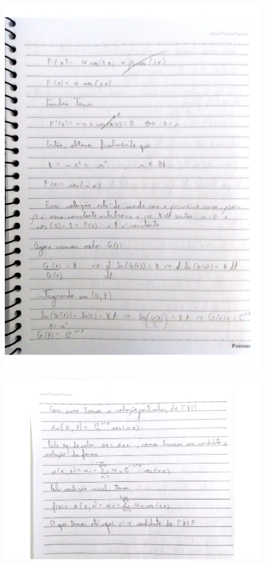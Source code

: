 \documentclass[a4paper]{article}
\begin{document}
                \begin{figure}{\textwidth}
            \centering
            \includegraphics[width=\textwidth]{Questoes-1-3_page-0005.jpg}
        \end{figure}
                        \begin{figure}{\textwidth}
            \centering
            \includegraphics[width=\textwidth]{Questoes-1-3_page-0006.jpg}
        \end{figure}
\end{document}
